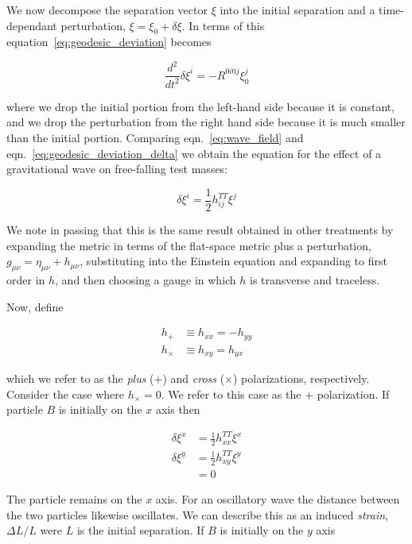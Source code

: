 We now decompose the separation vector $\xi$ into the initial
separation and a time-dependant perturbation, $\xi = \xi_0 + \delta
\xi$.  In terms of this equation~\ref{eq:geodesic_deviation} becomes

\begin{equation}
\label{eq:geodesic_deviation_delta}
\frac{d^2}{dt^2} \delta \xi^i = -R^{0 i 0 j} \xi_0^j
\end{equation}

where we drop the initial portion from the left-hand side because it
is constant, and we drop the perturbation from the right hand side
because it is much smaller than the initial portion.  Comparing
eqn.~\ref{eq:wave_field} and eqn.~\ref{eq:geodesic_deviation_delta}
we obtain the equation for the effect of a gravitational wave on
free-falling test masses:

\begin{equation}
\label{eq:wave_effect}
\delta \xi^i = \frac{1}{2} h^{TT}_{ij} \xi^j
\end{equation}

We note in passing that this is the same result obtained in other
treatments by expanding the metric in terms of the flat-space metric
plus a perturbation, $g_{\mu\nu} = \eta_{\mu\nu} + h_{\mu\nu}$,
substituting into the Einstein equation and expanding to first order
in $h$, and then choosing a gauge in which $h$ is transverse and
traceless.

Now, define

\begin{align*}
h_+ &\equiv h_{xx} = - h_{yy} \\
h_\times &\equiv h_{xy} = h_{yx}
\end{align*}

which we refer to as the \emph{plus} ($+$) and \emph{cross} ($\times$)
polarizations, respectively.  Consider the case where $h_\times = 0$.
We refer to this case as the $+$ polarization.  If particle $B$ is
initially on the $x$ axis then 

\begin{align*}
\delta \xi^x &= \frac{1}{2} h^{TT}_{xx} \xi^x \\
\delta \xi^y &= \frac{1}{2} h^{TT}_{xy} \xi^y \\
&= 0
\end{align*}

The particle remains on the $x$ axis.  For an oscillatory wave the
distance between the two particles likewise oscillates.  We can
describe this as an induced \emph{strain}, $\Delta L/L$ were $L$ is
the initial separation.  If $B$ is initially on the $y$ axis


